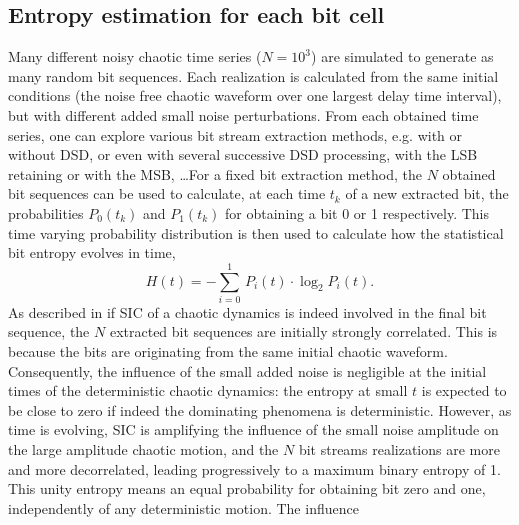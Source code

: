 \subsection{Entropy estimation for each bit cell}
%
%
Many different noisy chaotic time series ($N=10^3$) are simulated to
generate as many random bit sequences. Each realization is calculated
from the same initial conditions (the noise free chaotic waveform over
one largest delay time interval), but with different added small noise
perturbations. From each obtained time series, one can explore various
bit stream extraction methods, e.g. with or without DSD, or even with
several successive DSD processing, with the LSB retaining or with the
MSB, \ldots For a fixed bit extraction method, the $N$ obtained bit
sequences can be used to calculate, at each time $t_k$ of a new
extracted bit, the probabilities $P_0(t_k)$ and $P_1(t_k)$ for
obtaining a bit 0 or 1 respectively. This time varying probability
distribution is then used to calculate how the statistical bit entropy
evolves in time,
%
\begin{equation}
  \label{entropy_compute}
  H(t) = -\sum^1_{i=0}\,P_i(t)\cdot\log_2P_i(t).
\end{equation}
%
As described in \cite{PhysRevE.85.016211} if SIC of a chaotic dynamics
is indeed involved in the final bit sequence, the $N$ extracted bit
sequences are initially strongly correlated. This is because the bits
are originating from the same initial chaotic waveform. Consequently,
the influence of the small added noise is negligible at the initial
times of the deterministic chaotic dynamics: the entropy at small $t$
is expected to be close to zero if indeed the dominating phenomena is
deterministic. However, as time is evolving, SIC is amplifying the
influence of the small noise amplitude on the large amplitude chaotic
motion, and the $N$ bit streams realizations are more and more
decorrelated, leading progressively to a maximum binary entropy of
1. This unity entropy means an equal probability for obtaining bit
zero and one, independently of any deterministic motion. The influence
